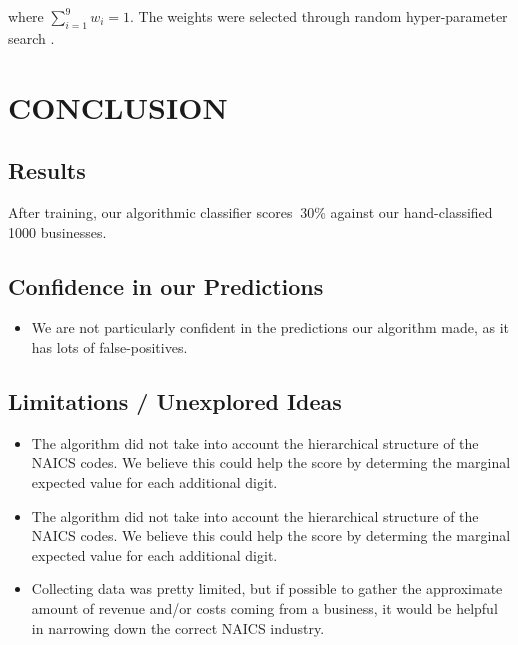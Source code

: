 \documentclass[letterpaper, 10 pt, conference]{IEEEtran}
\begin{document}
where $\sum_{i=1}^9 w_i=1$. The weights were selected through random hyper-parameter search \cite{random}.



\section{CONCLUSION}

\subsection{Results}

After training, our algorithmic classifier scores $~30\%$ against our hand-classified 1000 businesses.

\subsection{Confidence in our Predictions}

\begin{itemize}
\item We are not particularly confident in the predictions our algorithm made, as it has lots of false-positives.
\end{itemize}


\subsection{Limitations / Unexplored Ideas}
\begin{itemize}
\item The algorithm did not take into account the hierarchical structure of the NAICS codes. We believe this could help the score by determing the marginal expected value for each additional digit.
\item The algorithm did not take into account the hierarchical structure of the NAICS codes. We believe this could help the score by determing the marginal expected value for each additional digit.
\item Collecting data was pretty limited, but if possible to gather the approximate amount of revenue and/or costs coming from a business, it would be helpful in narrowing down the correct NAICS industry.
\end{itemize}
\end{document}
